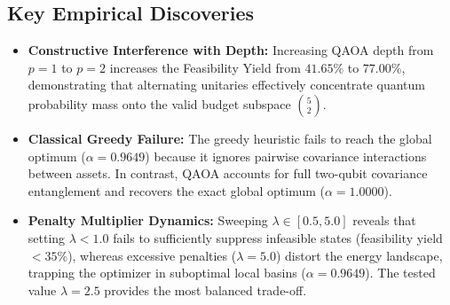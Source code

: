 \subsection{Key Empirical Discoveries}
\begin{itemize}
    \item \textbf{Constructive Interference with Depth:} Increasing QAOA depth from $p=1$ to $p=2$ increases the Feasibility Yield from $41.65\%$ to $77.00\%$, demonstrating that alternating unitaries effectively concentrate quantum probability mass onto the valid budget subspace $\binom{5}{2}$.
    \item \textbf{Classical Greedy Failure:} The greedy heuristic fails to reach the global optimum ($\alpha = 0.9649$) because it ignores pairwise covariance interactions between assets. In contrast, QAOA accounts for full two-qubit covariance entanglement and recovers the exact global optimum ($\alpha = 1.0000$).
    \item \textbf{Penalty Multiplier Dynamics:} Sweeping $\lambda \in [0.5, 5.0]$ reveals that setting $\lambda < 1.0$ fails to sufficiently suppress infeasible states (feasibility yield $< 35\%$), whereas excessive penalties ($\lambda = 5.0$) distort the energy landscape, trapping the optimizer in suboptimal local basins ($\alpha = 0.9649$). The tested value $\lambda = 2.5$ provides the most balanced trade-off.
\end{itemize}
